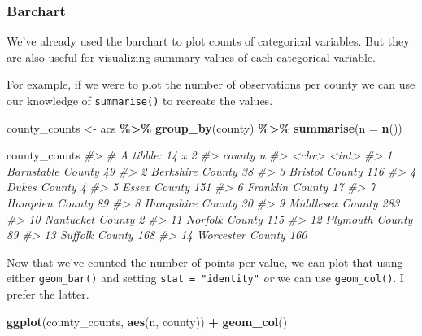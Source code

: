 \documentclass[
]{book}
\newenvironment{Shaded}{\begin{snugshade}}{\end{snugshade}}
\newcommand{\CommentTok}[1]{\textcolor[rgb]{0.56,0.35,0.01}{\textit{#1}}}
\newcommand{\DataTypeTok}[1]{\textcolor[rgb]{0.13,0.29,0.53}{#1}}
\newcommand{\KeywordTok}[1]{\textcolor[rgb]{0.13,0.29,0.53}{\textbf{#1}}}
\newcommand{\NormalTok}[1]{#1}
\newcommand{\OperatorTok}[1]{\textcolor[rgb]{0.81,0.36,0.00}{\textbf{#1}}}
\newcommand{\StringTok}[1]{\textcolor[rgb]{0.31,0.60,0.02}{#1}}
\begin{document}
\hypertarget{barchart-1}{%
\subsubsection{Barchart}\label{barchart-1}}

We've already used the barchart to plot counts of categorical variables. But they are also useful for visualizing summary values of each categorical variable.

For example, if we were to plot the number of observations per county we can use our knowledge of \texttt{summarise()} to recreate the values.

\begin{Shaded}
\begin{Highlighting}[]
\NormalTok{county\_counts \textless{}{-}}\StringTok{ }\NormalTok{acs }\OperatorTok{\%\textgreater{}\%}\StringTok{ }
\StringTok{  }\KeywordTok{group\_by}\NormalTok{(county) }\OperatorTok{\%\textgreater{}\%}\StringTok{ }
\StringTok{  }\KeywordTok{summarise}\NormalTok{(}\DataTypeTok{n =} \KeywordTok{n}\NormalTok{())}

\NormalTok{county\_counts}
\CommentTok{\#\textgreater{} \# A tibble: 14 x 2}
\CommentTok{\#\textgreater{}    county                n}
\CommentTok{\#\textgreater{}    \textless{}chr\textgreater{}             \textless{}int\textgreater{}}
\CommentTok{\#\textgreater{}  1 Barnstable County    49}
\CommentTok{\#\textgreater{}  2 Berkshire County     38}
\CommentTok{\#\textgreater{}  3 Bristol County      116}
\CommentTok{\#\textgreater{}  4 Dukes County          4}
\CommentTok{\#\textgreater{}  5 Essex County        151}
\CommentTok{\#\textgreater{}  6 Franklin County      17}
\CommentTok{\#\textgreater{}  7 Hampden County       89}
\CommentTok{\#\textgreater{}  8 Hampshire County     30}
\CommentTok{\#\textgreater{}  9 Middlesex County    283}
\CommentTok{\#\textgreater{} 10 Nantucket County      2}
\CommentTok{\#\textgreater{} 11 Norfolk County      115}
\CommentTok{\#\textgreater{} 12 Plymouth County      89}
\CommentTok{\#\textgreater{} 13 Suffolk County      168}
\CommentTok{\#\textgreater{} 14 Worcester County    160}
\end{Highlighting}
\end{Shaded}

Now that we've counted the number of points per value, we can plot that using either \texttt{geom\_bar()} and setting \texttt{stat\ =\ "identity"} \emph{or} we can use \texttt{geom\_col()}. I prefer the latter.

\begin{Shaded}
\begin{Highlighting}[]
\KeywordTok{ggplot}\NormalTok{(county\_counts, }\KeywordTok{aes}\NormalTok{(n, county)) }\OperatorTok{+}
\StringTok{  }\KeywordTok{geom\_col}\NormalTok{()}
\end{Highlighting}
\end{Shaded}
\end{document}
